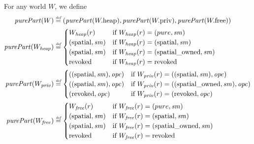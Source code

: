\documentclass[a4paper]{article}
\begin{document}
\begin{definition}
  \label{def:purePart}
  For any world $W$, we define
  \begin{align*}
    \purePart{W} &\defeq (\purePart{\pwheap},\purePart{\pwpriv},\purePart{\pwfree})\\
    \purePart{W_\var{heap}} &\defeq
                       \begin{cases}
                         W_{\var{heap}}(r) & \text{if } W_\var{heap}(r) = (pure,\var{sm})\\
                         (\spatial,\var{sm}) & \text{if } W_\var{heap}(r) = (\spatial,\var{sm})\\
                         (\spatial,\var{sm}) & \text{if } W_\var{heap}(r) = (\spatialo,\var{sm})\\
                         \revoked & \text{if } W_\var{heap}(r) = \revoked\\
                       \end{cases}\\
    \purePart{W_\var{priv}} &\defeq
                       \begin{cases}
                         ((\spatial,\var{sm}),\opc) & \text{if } W_\var{priv}(r) = ((\spatial,\var{sm}),\opc)\\
                         ((\spatial,\var{sm}),\opc) & \text{if } W_\var{priv}(r) = ((\spatialo,\var{sm}),\opc)\\
                         (\revoked,\opc) & \text{if } W_\var{priv}(r) = (\revoked,\opc)\\
                       \end{cases}\\
    \purePart{W_\var{free}} &\defeq
                       \begin{cases}
                         W_{\var{free}}(r) & \text{if } W_{\var{free}}(r) = (pure,\var{sm})\\
                         (\spatial,\var{sm}) & \text{if } W_{\var{free}}(r) = (\spatial,\var{sm})\\
                         (\spatial,\var{sm}) & \text{if } W_{\var{free}}(r) = (\spatialo,\var{sm})\\
                         \revoked & \text{if } W_{\var{free}}(r) = \revoked\\
                       \end{cases}
  \end{align*}
\end{definition}
\end{document}
